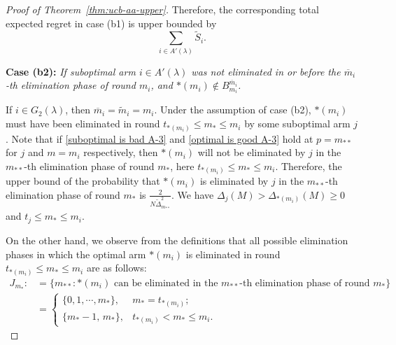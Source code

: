 \documentclass[
  12pt]{article}
\begin{document}
\begin{proof}[Proof of Theorem~\ref{thm:ucb-aa-upper}]
Therefore, the corresponding total expected regret in case (b1) is upper bounded by 
\[\sum_{i \in A'(\lambda)} \tilde{S}_i.\]

\textbf{Case (b2):}\textit{ If suboptimal arm \( i \in A'(\lambda) \) was not eliminated in or before the $\overline{m}_{i}$-th elimination phase of round $m_i$, and \( *(m_i) \notin B_{m_i}^{\overline{m}_i} \). }  

If $i\in G_2(\lambda)$, then $\overline{m}_i=\tilde{m}_i=m_i$. Under the assumption of case (b2), $*(m_i)$ must have been eliminated in round \( t_{*(m_i)} \leq m_* \leq m_i \) by some suboptimal arm \( j \). Note that if \eqref{suboptimal is bad A-3} and \eqref{optimal is good A-3} hold at \(p= m_{**} \) for $j$ and $m=m_i$ respectively, then \( *(m_i) \) will not be eliminated by \( j \) in the $m_{**}$-th elimination phase of round $m_*$, here $t_{*(m_i)}\leq m_*\leq m_i$. Therefore, the upper bound of the probability that \( *(m_i) \) is eliminated by \( j \) in the $m_{**}$-th elimination phase of round $m_*$ is \( \frac{2}{N \tilde{\Delta}_{m_{**}}^2} \). We have \( \Delta_j(M) > \Delta_{*(m_i)}(M) \geq 0 \) and \( t_j \leq m_* \leq m_i \). 

On the other hand, we observe from the definitions that all possible elimination phases in which the optimal arm $*(m_i)$ is eliminated in round $ t_{*(m_i)} \leq m_* \leq m_i $ are as follows:
\begin{align*}
    J_{m_*}:&=\{m_{**}:\text{$*(m_i)$ can be eliminated in the } m_{**} \text{-th elimination phase of round $m_*$}\}\\
    &=\begin{cases}
    \{0,1,\cdots, m_*\},& m_*=t_{*(m_i)};\\
    \{m_*-1,\, m_*\}, &t_{*(m_i)}<m_*\leq m_i.
\end{cases}
\end{align*}


\end{proof}
\end{document}
